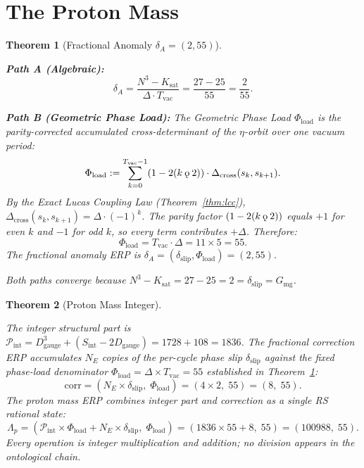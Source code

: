 \documentclass[11pt,letterpaper]{article}
\theoremstyle{plain}
\newtheorem{theorem}{Theorem}[section]
\theoremstyle{definition}
\theoremstyle{remark}
\newcommand{\aop}{\eta}
\newcommand{\Dcross}{\Delta_{\mathrm{cross}}}
\newcommand{\koppa}{\mathbin{\text{\rm\k{o}}}}
\newcommand{\Dg}{D_{\mathrm{gauge}}}
\newcommand{\Sint}{S_{\mathrm{int}}}
\newcommand{\Gmg}{G_{\mathrm{mg}}}
\newcommand{\Ksat}{K_{\mathrm{sat}}}
\newcommand{\dslip}{\delta_{\mathrm{slip}}}
\newcommand{\Tvac}{T_{\mathrm{vac}}}
\newcommand{\Lambdap}{\Lambda_p}
\newcommand{\dA}{\delta_A}
\begin{document}
\section{The Proton Mass}\label{sec:proton}

\begin{theorem}[Fractional Anomaly
$\dA=(2,55)$]\label{thm:deltaA}
\begin{rsbox}
\textbf{Path A (Algebraic):}
\[
\dA=\frac{N^3-\Ksat}{\Delta\cdot\Tvac}=\frac{27-25}{55}=\frac{2}{55}.
\]

\textbf{Path B (Geometric Phase Load):}
The Geometric Phase Load $\Phi_{\mathrm{load}}$ is the
parity-corrected accumulated cross-determinant of the $\aop$-orbit
over one vacuum period:
\[
\Phi_{\mathrm{load}}
:=\sum_{k=0}^{\Tvac-1}(1-2(k\koppa2))\cdot\Dcross(s_k,s_{k+1}).
\]
By the Exact Lucas Coupling Law (Theorem~\ref{thm:lcc}),
$\Dcross(s_k,s_{k+1})=\Delta\cdot(-1)^k$.  The parity factor
$(1-2(k\koppa2))$ equals $+1$ for even $k$ and $-1$ for odd $k$,
so every term contributes $+\Delta$.  Therefore:
\[
\Phi_{\mathrm{load}}=\Tvac\cdot\Delta=11\times5=55.
\]
The fractional anomaly ERP is $\dA=(\dslip,\Phi_{\mathrm{load}})=(2,55)$.

Both paths converge because $N^3-\Ksat=27-25=2=\dslip=\Gmg$.
\end{rsbox}
\end{theorem}

\begin{theorem}[Proton Mass Integer]\label{thm:proton}
\begin{rsbox}
The integer structural part is $\mathcal{P}_{\mathrm{int}} = \Dg^3 + (\Sint - 2\Dg) = 1728 + 108 = 1836$. The fractional correction ERP accumulates $N_E$ copies of the per-cycle phase slip $\dslip$ against the fixed phase-load denominator $\Phi_{\mathrm{load}} = \Delta\times\Tvac = 55$ established in Theorem~\ref{thm:deltaA}:
\[
\mathrm{corr} = (N_E\times\dslip,\;\Phi_{\mathrm{load}}) = (4\times2,\;55) = (8,\;55).
\]
The proton mass ERP combines integer part and correction as a single RS rational state:
\[
\Lambdap = (\mathcal{P}_{\mathrm{int}}\times\Phi_{\mathrm{load}} + N_E\times\dslip,\;\Phi_{\mathrm{load}})
= (1836\times55 + 8,\;55) = (100988,\;55).
\]
Every operation is integer multiplication and addition; no division appears in the ontological chain.
\end{rsbox}
\end{theorem}
\end{document}
